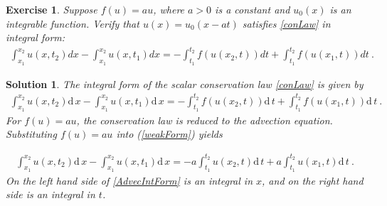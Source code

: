 \documentclass[10pt,letterpaper]{article}
\newcommand{\dif}[1][]{\mathrm{d} {#1}\,}
\newcommand{\frb}[1]{ \left(  {#1} \right) }
\theoremstyle{break}
\newtheorem{exercise}{Exercise}
\newtheorem{solution}{Solution}
\begin{document}
\begin{exercise}
	Suppose $f\!\left(u\right)=au$, where $a>0$ is a constant and $u_{0}\!\left(x\right)$ is an integrable function. Verify that $u(x)=u_{0}(x-at)$ satisfies \eqref{conLaw} in integral form:
	\begin{gather} \label{weakForm}
		\int_{x_{1}}^{x_{2}}u\!\left(x,t_{2}\right) dx
		-
		\int_{x_{1}}^{x_{2}}u\!\left(x,t_{1}\right)dx
		=
		-
		\int_{t_{1}}^{t_{2}}f\!\left(u\!\left(x_{2},t\right)\right)dt
		+
		\int_{t_{1}}^{t_{2}}f\!\left(u\!\left(x_{1},t\right)\right)dt 
		\ .
	\end{gather}%
\end{exercise}

\begin{solution}
	The integral form of the scalar conservation law \eqref{conLaw} is given by 
	\begin{gather} \label{weakForm}
		\int_{x_{1}}^{x_{2}}u\frb{x,t_{2}} \dif x
				-\int_{x_{1}}^{x_{2}}u\frb{x,t_{1}} \dif x
			=-\int_{t_{1}}^{t_{2}}f\frb{u\frb{x_{2},t}} \dif t
				+\int_{t_{1}}^{t_{2}}f\frb{u\frb{x_{1},t}} \dif t\ .
	\end{gather}
	For $f(u)=au$, the conservation law is reduced to the advection equation. Substituting $f\!\left(u\right)=au$ into (\ref{weakForm})
	yields
	
	\begin{gather} \label{AdvecIntForm}
		\int_{x_{1}}^{x_{2}}u\frb{x,t_{2}} \dif x
				-\int_{x_{1}}^{x_{2}}u\frb{x,t_{1}} \dif x
			=-a \int_{t_{1}}^{t_{2}} u\frb{x_{2},t} \dif t
				+a\int_{t_{1}}^{t_{2}} u\frb{x_{1},t} \dif t\  .
	\end{gather}
	On the left hand side of \eqref{AdvecIntForm} is an integral in $x$, and on the right hand side is an integral in $t$.
	

\end{solution}
\end{document}
